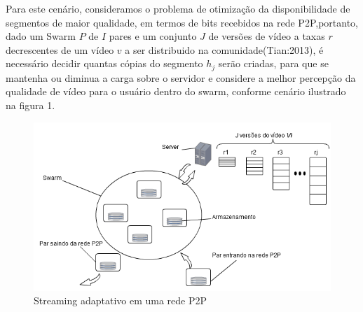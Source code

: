 \documentclass[
	12pt,				%
	oneside,			%
	a4paper,			%
	english,			%
	brazil				%
	]{abntex2ppgsi}
\begin{document}
Para este cenário, consideramos o problema de otimização da disponibilidade de segmentos de maior qualidade, em termos de bits recebidos na rede P2P,portanto, dado um Swarm $P$ de  $I$ pares e um conjunto $J$ de versões de vídeo a taxas $r$ decrescentes \vetr de um vídeo $v$ a ser distribuido na comunidade(Tian:2013), é necessário decidir quantas cópias do segmento $h_j$ serão criadas, para que se mantenha ou diminua a carga sobre o servidor e considere a melhor percepção da qualidade de vídeo para o usuário dentro do swarm, conforme cenário ilustrado na figura 1.

% 
%
%
%
%

\begin{figure}[H]%
	\centering
 	  \caption{Streaming adaptativo em uma rede P2P}
		\includegraphics{figuras/Jversoes.png}
\end{figure}
\end{document}
